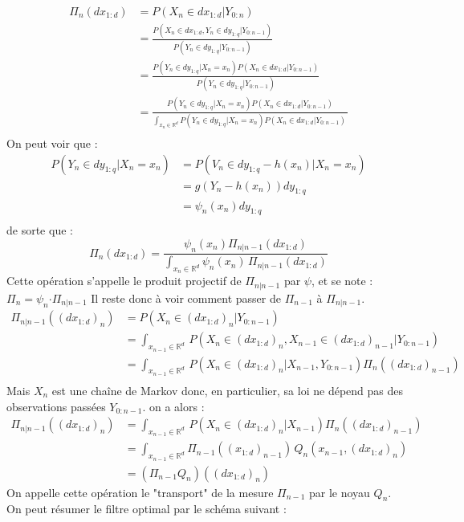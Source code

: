\documentclass{article}
\begin{document}
\begin{align*}
   \Pi_n(dx_{1:d}) &=P(X_n \in dx_{1:d} \vert Y_{0:n})\\
                  &=\frac{P(X_n \in dx_{1:d}, Y_n \in dy_{1:q} \vert Y_{0:n-1})}
                  {P(Y_n \in dy_{1:q} \vert Y_{0:n-1})}\\
                  &= \frac{P(Y_n \in dy_{1:q} \vert X_n = x_n)P(X_n \in dx_{1:d} \vert Y_{0:n-1})}
                  {P(Y_n \in dy_{1:q} \vert Y_{0:n-1})}\\
                  &= \frac{P(Y_n \in dy_{1:q} \vert X_n = x_n)P(X_n \in dx_{1:d} \vert Y_{0:n-1})}
                  {\displaystyle{\int_{x_n \in \mathbb{R}^d} P(Y_n \in dy_{1:q} \vert X_n = x_n)P(X_n \in dx_{1:d} \vert Y_{0:n-1}) \, }}\\
\end{align*}
On peut voir que : 
\begin{align*}
   P(Y_n \in dy_{1:q} \vert X_n =x_n)&=P(V_n \in dy_{1:q}-h(x_n) \vert X_n = x_n)\\
   &=g(Y_n-h(x_n))dy_{1:q}\\
   &=\psi_n(x_n)dy_{1:q}\\
\end{align*}
de sorte que : 
\[\Pi_n(dx_{1:d}) = \frac{\psi_n(x_n)\Pi_{n \vert n-1}(dx_{1:d})}{\displaystyle{\int_{x_n \in \mathbb{R}^d} \psi_n(x_n)\,\Pi_{n \vert n-1}(dx_{1:d})}}\]
Cette opération s'appelle le produit projectif de $\Pi_{n \vert n-1}$ par $\psi$, et se note : $\Pi_{n} = \psi_n \boldsymbol{\cdot} \Pi_{n \vert n-1}$
\newline
Il reste donc à voir comment passer de $\Pi_{n-1}$ à $\Pi_{n \vert n-1}$.
\begin{align*}
   \Pi_{n \vert n-1}((dx_{1:d})_n) &= P(X_n \in (dx_{1:d})_{n}\vert Y_{0:n-1})\\
   &=\displaystyle{\int_{x_{n-1}\in \mathbb{R}^d} \,P(X_n \in (dx_{1:d})_n,X_{n-1} \in (dx_{1:d})_{n-1} \vert Y_{0:n-1})}\\
   & = \displaystyle{\int_{x_{n-1}\in \mathbb{R}^d} \,
    P(X_n \in (dx_{1:d})_n \vert X_{n-1}, Y_{0:n-1}) 
    \Pi_{n}((dx_{1:d})_{n-1})}\\
\end{align*}
Mais $X_n$ est une chaîne de Markov donc, en particulier, sa loi ne dépend pas des observations passées $Y_{0:n-1}$. on a alors : 
\begin{align*}
   \Pi_{n \vert n-1}((dx_{1:d})_n) & =  \displaystyle{\int_{x_{n-1}\in \mathbb{R}^d} \,
   P(X_n \in (dx_{1:d})_n \vert X_{n-1}) 
   \Pi_{n}((dx_{1:d})_{n-1})}\\
   &=\displaystyle{\int_{x_{n-1}\in \mathbb{R}^d}\Pi_{n-1}((x_{1:d})_{n-1})\,Q_n(x_{n-1},(dx_{1:d})_n)}\\
   &=(\Pi_{n-1}Q_n)((dx_{1:d})_n)
\end{align*}
On appelle cette opération le "transport" de la mesure $\Pi_{n-1}$ par le noyau $Q_n$.
\\
On peut résumer le filtre optimal par le schéma suivant : 
\end{document}

